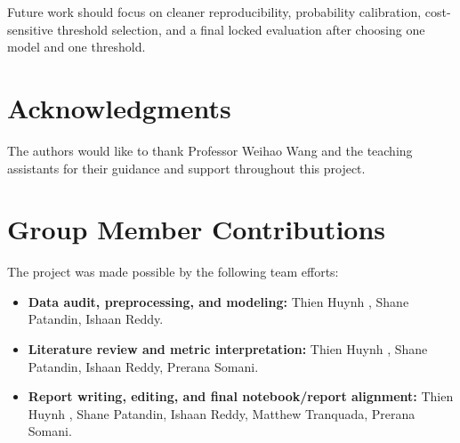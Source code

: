 \documentclass[10pt,twocolumn]{article}
\begin{document}
Future work should focus on cleaner reproducibility, probability calibration, cost-sensitive threshold selection, and a final locked evaluation after choosing one model and one threshold.

\section*{Acknowledgments}
The authors would like to thank Professor Weihao Wang and the teaching assistants for their guidance and support throughout this project.

\section{Group Member Contributions}
The project was made possible by the following team efforts:
\begin{itemize}
  \item \textbf{Data audit, preprocessing, and modeling:} Thien Huynh , Shane Patandin, Ishaan Reddy.
  \item \textbf{Literature review and metric interpretation:} Thien Huynh , Shane Patandin, Ishaan Reddy, Prerana Somani.
  \item \textbf{Report writing, editing, and final notebook/report alignment:} Thien Huynh , Shane Patandin, Ishaan Reddy, Matthew Tranquada, Prerana Somani.
\end{itemize}
\end{document}
